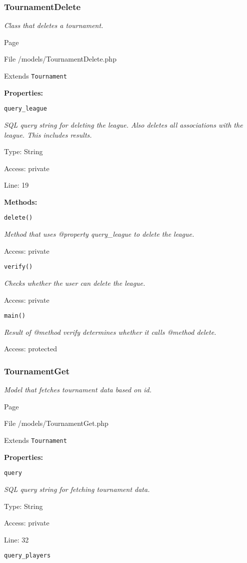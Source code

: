 \subsubsection{TournamentDelete}
\textit{Class that deletes a tournament.}

Page \pageref{TournamentDelete.php}

File /models/TournamentDelete.php

Extends \texttt{Tournament}

\textbf{Properties:}

\texttt{query\_league}

{\scriptsize
\textit{SQL query string for deleting the league.
Also deletes all associations with the league.
This includes results.}

Type: String

Access: private

Line: 19

}
\textbf{Methods:}

\texttt{delete()}

{\scriptsize
\textit{Method that uses @property query\_league to delete the league.}

Access: private

}

\texttt{verify()}

{\scriptsize
\textit{Checks whether the user can delete the league.}

Access: private

}

\texttt{main()}

{\scriptsize
\textit{Result of @method verify determines whether it calls @method delete.}

Access: protected

}

\subsubsection{TournamentGet}
\textit{Model that fetches tournament data based on id.}

Page \pageref{TournamentGet.php}

File /models/TournamentGet.php

Extends \texttt{Tournament}

\textbf{Properties:}

\texttt{query}

{\scriptsize
\textit{SQL query string for fetching tournament data.}

Type: String

Access: private

Line: 32

}
\texttt{query\_players}

